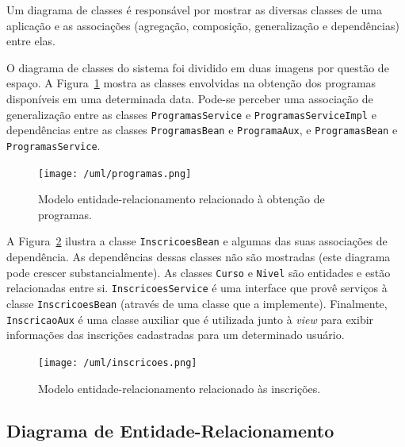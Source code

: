 \documentclass[
  10.5pt,				  %
	openright,			%
	twoside,			  %
  a5paper,
  chapter=TITLE,	%
	section=TITLE,	%
  hyphens,        %
	english,        %
	brazil          %
]{abntex2}
\begin{document}
Um diagrama de classes é responsável por mostrar as diversas classes de uma aplicação e as associações (agregação, composição, generalização e dependências) entre elas.

O diagrama de classes do sistema foi dividido em duas imagens por questão de espaço. A Figura~\ref{fig:uml_er1} mostra as classes envolvidas na obtenção dos programas disponíveis em uma determinada data. Pode-se perceber uma associação de generalização entre as classes \texttt{ProgramasService} e \texttt{ProgramasServiceImpl} e dependências entre as classes \texttt{ProgramasBean} e \texttt{ProgramaAux}, e \texttt{ProgramasBean} e \texttt{ProgramasService}.

\begin{figure}[!ht]
  \caption{\label{fig:uml_er1} Modelo entidade-relacionamento relacionado à obtenção de programas. }
  \begin{center}
    \texttt{[image: /uml/programas.png]}
  \end{center}
\end{figure}

A Figura~\ref{fig:uml_er2} ilustra a classe \texttt{InscricoesBean} e algumas das suas associações de dependência. As dependências dessas classes não são mostradas (este diagrama pode crescer substancialmente). As classes \texttt{Curso} e \texttt{Nivel} são entidades e estão relacionadas entre si. \texttt{InscricoesService} é uma interface que provê serviços à classe \texttt{InscricoesBean} (através de uma classe que a implemente). Finalmente, \texttt{InscricaoAux} é uma classe auxiliar que é utilizada junto à \emph{view} para exibir informações das inscrições cadastradas para um determinado usuário.

\begin{landscape}
\begin{figure}[!ht]
  \caption{\label{fig:uml_er2} Modelo entidade-relacionamento relacionado às inscrições. }
  \begin{center}
    \texttt{[image: /uml/inscricoes.png]}
  \end{center}
\end{figure}
\end{landscape}

\subsection{Diagrama de Entidade-Relacionamento}
\end{document}
